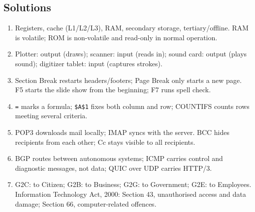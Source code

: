 \documentclass[11pt]{article}
\begin{document}
\subsection*{Solutions}
\begingroup\small
\begin{enumerate}[label=\arabic*.]
  \item Registers, cache (L1/L2/L3), RAM, secondary storage, tertiary/offline.
    RAM is volatile; ROM is non-volatile and read-only in normal operation.
  \item Plotter: output (draws); scanner: input (reads in); sound card: output
    (plays sound); digitizer tablet: input (captures strokes).
  \item Section Break restarts headers/footers; Page Break only starts a new
    page. F5 starts the slide show from the beginning; F7 runs spell check.
  \item \texttt{=} marks a formula; \texttt{\$A\$1} fixes both column and row;
    COUNTIFS counts rows meeting several criteria.
  \item POP3 downloads mail locally; IMAP syncs with the server. BCC hides
    recipients from each other; Cc stays visible to all recipients.
  \item BGP routes between autonomous systems; ICMP carries control and
    diagnostic messages, not data; QUIC over UDP carries HTTP/3.
  \item G2C: to Citizen; G2B: to Business; G2G: to Government; G2E: to
    Employees. Information Technology Act, 2000: Section 43, unauthorised
    access and data damage; Section 66, computer-related offences.
\end{enumerate}
\endgroup
\end{document}

